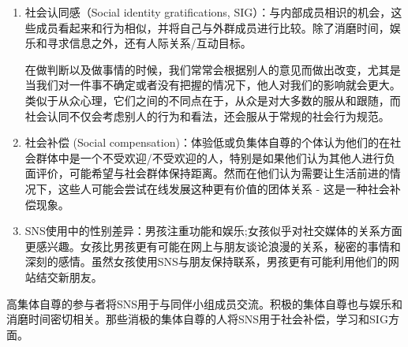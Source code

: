 \begin{enumerate}
\item 社会认同感（Social identity gratifications, SIG）：与内部成员相识的机会，这些成员看起来和行为相似，并将自己与外群成员进行比较。除了消磨时间，娱乐和寻求信息之外，还有人际关系/互动目标。

在做判断以及做事情的时候，我们常常会根据别人的意见而做出改变，尤其是当我们对一件事不确定或者没有把握的情况下，他人对我们的影响就会更大。类似于从众心理，它们之间的不同点在于，从众是对大多数的服从和跟随，而社会认同不仅会考虑别人的行为和看法，还会服从于常规的社会行为规范。


\item 
社会补偿 (Social compensation)：体验低或负集体自尊的个体认为他们的在社会群体中是一个不受欢迎/不受欢迎的人，特别是如果他们认为其他人进行负面评价，可能希望与社会群体保持距离。然而在他们认为需要让生活前进的情况下，这些人可能会尝试在线发展这种更有价值的团体关系 - 这是一种社会补偿现象。

\item %
SNS使用中的性别差异：男孩注重功能和娱乐;女孩似乎对社交媒体的关系方面更感兴趣。女孩比男孩更有可能在网上与朋友谈论浪漫的关系，秘密的事情和深刻的感情。虽然女孩使用SNS与朋友保持联系，男孩更有可能利用他们的网站结交新朋友。

\end{enumerate}

高集体自尊的参与者将SNS用于与同伴小组成员交流。积极的集体自尊也与娱乐和消磨时间密切相关。那些消极的集体自尊的人将SNS用于社会补偿，学习和SIG方面。
 
